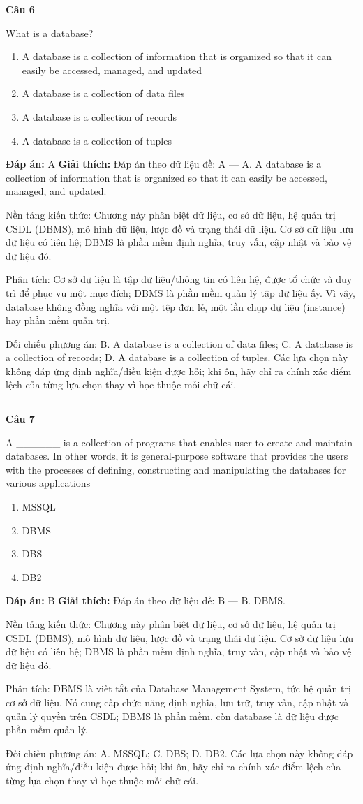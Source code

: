 \documentclass[11pt,a4paper]{article}
\newenvironment{question}[1]{%
  \par\vspace{1em}\noindent\textbf{\large Câu #1}\par\vspace{0.4em}
}{%
  \par\vspace{1em}\hrule\vspace{0.6em}
}
\newenvironment{choices}{%
  \begin{enumerate}[label=\textbf{\Alph*.},leftmargin=2.2em,itemsep=2pt,topsep=3pt]
}{%
  \end{enumerate}
}
\newcommand{\choice}{\item}
\begin{document}
\begin{question}{6}
What is a database?
\begin{choices}
\choice A database is a collection of information that is organized so that it can easily be accessed, managed, and updated
\choice A database is a collection of data files
\choice A database is a collection of records
\choice A database is a collection of tuples
\end{choices}
\textbf{Đáp án:} A
\textbf{Giải thích:} Đáp án theo dữ liệu đề: A — A. A database is a collection of information that is organized so that it can easily be accessed, managed, and updated.

Nền tảng kiến thức: Chương này phân biệt dữ liệu, cơ sở dữ liệu, hệ quản trị CSDL (DBMS), mô hình dữ liệu, lược đồ và trạng thái dữ liệu. Cơ sở dữ liệu lưu dữ liệu có liên hệ; DBMS là phần mềm định nghĩa, truy vấn, cập nhật và bảo vệ dữ liệu đó.

Phân tích: Cơ sở dữ liệu là tập dữ liệu/thông tin có liên hệ, được tổ chức và duy trì để phục vụ một mục đích; DBMS là phần mềm quản lý tập dữ liệu ấy. Vì vậy, database không đồng nghĩa với một tệp đơn lẻ, một lần chụp dữ liệu (instance) hay phần mềm quản trị.

Đối chiếu phương án: B. A database is a collection of data files; C. A database is a collection of records; D. A database is a collection of tuples. Các lựa chọn này không đáp ứng định nghĩa/điều kiện được hỏi; khi ôn, hãy chỉ ra chính xác điểm lệch của từng lựa chọn thay vì học thuộc mỗi chữ cái.
\end{question}

\begin{question}{7}
A ______ is a collection of programs that enables user to create and maintain databases. In other words, it is general-purpose software that provides the users with the processes of defining, constructing and manipulating the databases for various applications
\begin{choices}
\choice MSSQL
\choice DBMS
\choice DBS
\choice DB2
\end{choices}
\textbf{Đáp án:} B
\textbf{Giải thích:} Đáp án theo dữ liệu đề: B — B. DBMS.

Nền tảng kiến thức: Chương này phân biệt dữ liệu, cơ sở dữ liệu, hệ quản trị CSDL (DBMS), mô hình dữ liệu, lược đồ và trạng thái dữ liệu. Cơ sở dữ liệu lưu dữ liệu có liên hệ; DBMS là phần mềm định nghĩa, truy vấn, cập nhật và bảo vệ dữ liệu đó.

Phân tích: DBMS là viết tắt của Database Management System, tức hệ quản trị cơ sở dữ liệu. Nó cung cấp chức năng định nghĩa, lưu trữ, truy vấn, cập nhật và quản lý quyền trên CSDL; DBMS là phần mềm, còn database là dữ liệu được phần mềm quản lý.

Đối chiếu phương án: A. MSSQL; C. DBS; D. DB2. Các lựa chọn này không đáp ứng định nghĩa/điều kiện được hỏi; khi ôn, hãy chỉ ra chính xác điểm lệch của từng lựa chọn thay vì học thuộc mỗi chữ cái.
\end{question}
\end{document}

